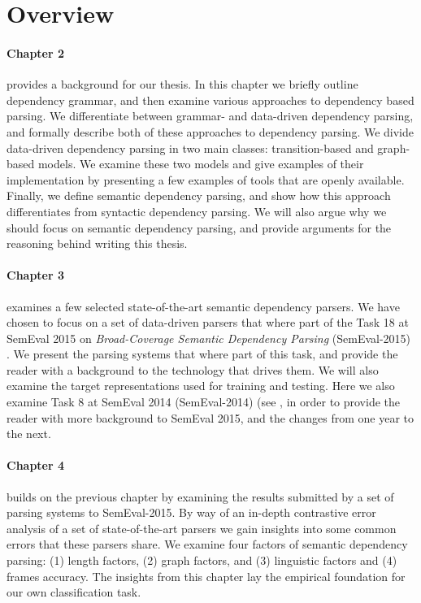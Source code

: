 \section{Overview} 

\paragraph{Chapter 2} provides a background for our thesis. In this chapter we briefly outline dependency grammar, and then examine various approaches to dependency based parsing. We differentiate between grammar- and data-driven dependency parsing, and formally describe both of these approaches to dependency parsing. We divide data-driven dependency parsing in two main classes: transition-based and graph-based models. We examine these two models and give examples of their implementation by presenting a few examples of tools that are openly available. Finally, we define semantic dependency parsing, and show how this approach differentiates from syntactic dependency parsing. We will also argue why we should focus on semantic dependency parsing, and provide arguments for the reasoning behind writing this thesis.

\paragraph{Chapter 3} examines a few selected state-of-the-art semantic dependency parsers. We have chosen to focus on a set of data-driven parsers that where part of the Task 18 at SemEval 2015 on \textit{Broad-Coverage Semantic Dependency Parsing} (SemEval-2015) \cite{Oepen:15}. We present the parsing systems that where part of this task, and provide the reader with a background to the technology that drives them. We will also examine the target representations used for training and testing. Here we also examine Task 8 at SemEval 2014 (SemEval-2014) (see , in order to provide the reader with more background to SemEval 2015, and the changes from one year to the next.

\paragraph{Chapter 4} builds on the previous chapter by examining the results submitted by a set of parsing systems to SemEval-2015. By way of an in-depth contrastive error analysis of a set of state-of-the-art parsers we gain insights into some common errors that these parsers share. We examine four factors of semantic dependency parsing: (1) length factors, (2) graph factors, and (3) linguistic factors and (4) frames accuracy. The insights from this chapter lay the empirical foundation for our own classification task.

